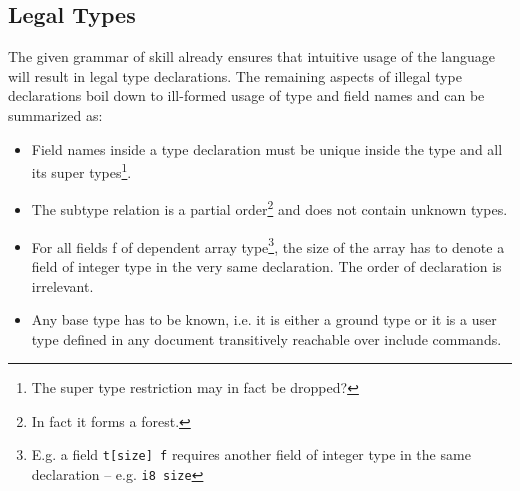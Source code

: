 \subsection{Legal Types}

The given grammar of \gls{skill} already ensures that intuitive usage of the language will result in legal type declarations. The remaining aspects of illegal type declarations boil down to ill-formed usage of type and field names and can be summarized as:
\begin{itemize}
 \item Field names inside a type declaration must be unique inside the type and all its super types\footnote{The super type restriction may in fact be dropped?}.
 
 \item The subtype relation is a partial order\footnote{In fact it forms a forest.} and does not contain unknown types.

 \item For all fields f of dependent array type\footnote{E.g. a field \texttt{t[size] f} requires another field of integer type in the same declaration -- e.g. \texttt{i8 size}}, the size of the array has to denote a field of integer type in the very same declaration. The order of declaration is irrelevant.
 
 \item Any base type has to be known, i.e. it is either a ground type or it is a user type defined in any document transitively reachable over include commands.
\end{itemize}


% 
% 
% 
% 


